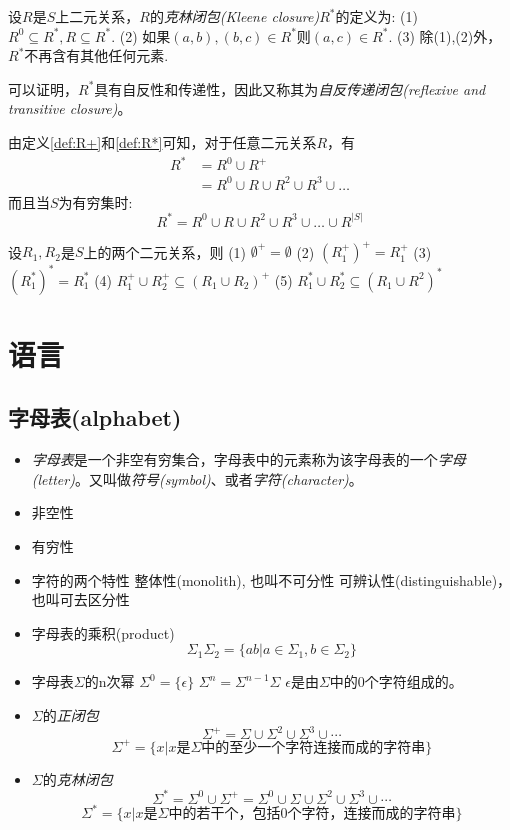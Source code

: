 \begin{definition}\label{def:R*}
	设$R$是$S$上二元关系，$R$的\emph{克林闭包(Kleene closure)}$R^\ast$的定义为:
	\subitem(1) $R^0 \subseteq R^*,R\subseteq R^{\ast}$.
	\subitem(2) 如果$(a,b),(b,c)\in R^{\ast}$则$(a,c)\in R^{\ast}$.
	\subitem(3) 除(1),(2)外，$R^{\ast}$不再含有其他任何元素.
	
	可以证明，$R^\ast$具有自反性和传递性，因此又称其为\emph{自反传递闭包(reflexive and transitive closure)}。
\end{definition}

由定义\ref{def:R+}和\ref{def:R*}可知，对于任意二元关系$R$，有
\begin{align*}
	R^{\ast} &=R^{0}\cup R^{+} \\
	&=R^{0}\cup R\cup R^{2}\cup R^{3}\cup \dots
\end{align*}
而且当$S$为有穷集时:
\[R^{\ast} =R^{0}\cup R\cup R^{2}\cup R^{3}\cup \dots \cup R^{|S|} \]

设$R_1,R_2$是$S$上的两个二元关系，则
\subitem(1) $\emptyset^{+}=\emptyset$
\subitem(2) $(R_1^{+})^{+} = R_1^{+}$
\subitem(3) $(R_1^{\ast})^{\ast} = R_1^{\ast}$
\subitem(4) $R_1^{+}\cup R_2^{+} \subseteq (R_1 \cup R_2)^{+}$
\subitem(5) $R_1^{\ast}\cup R_2^{\ast} \subseteq (R_1\cup R^2)^{\ast}$	

\section{语言}
\subsection{字母表(alphabet)}
\begin{itemize}
	\item \emph{字母表}是一个非空有穷集合，字母表中的元素称为该字母表的一个\emph{字母(letter)}。又叫做\emph{符号(symbol)}、或者\emph{字符(character)}。
	\item 非空性
	\item 有穷性
	\item 字符的两个特性
		\subitem{-} 整体性(monolith), 也叫不可分性
		\subitem{-} 可辨认性(distinguishable)，也叫可去区分性
	\item 字母表的乘积(product)
	\[\Sigma_1\Sigma_2 = \{ab|a\in \Sigma_1,b\in \Sigma_2 \} \]
	\item 字母表$\Sigma$的n次幂
		\subitem $\Sigma^0 = \{\epsilon\}$
		\subitem $\Sigma^n = \Sigma^{n-1}\Sigma$
		\subitem $\epsilon$是由$\Sigma$中的0个字符组成的。
	\item $\Sigma$的\emph{正闭包}
		\[\Sigma^{+} = \Sigma \cup \Sigma^2 \cup \Sigma^3 \cup \cdots \]
		\[\Sigma^+ = \{x|x\text{是}\Sigma\text{中的至少一个字符连接而成的字符串}\} \]
	\item $\Sigma$的\emph{克林闭包}
		\[\Sigma^{\ast} = \Sigma^0 \cup \Sigma^+ = \Sigma^0 \cup \Sigma \cup \Sigma^2 \cup \Sigma^3 \cup \cdots \]
		\[\Sigma^{\ast} = \{x|x\text{是}\Sigma\text{中的若干个，包括0个字符，连接而成的字符串}\} \]
\end{itemize}

